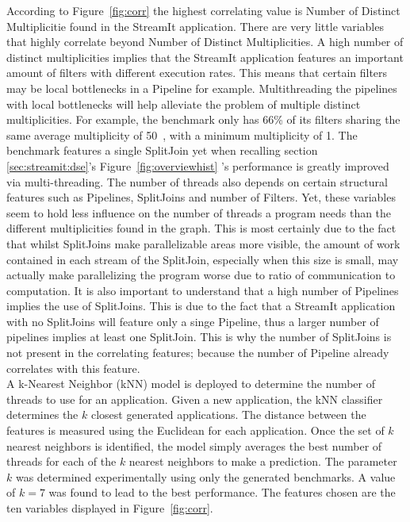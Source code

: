 According to Figure~\ref{fig:corr} the highest correlating value is Number of Distinct Multiplicitie found in the StreamIt application.
There are very little variables that highly correlate beyond Number of Distinct Multiplicities.
A high number of distinct multiplicities implies that the StreamIt application features an important amount of filters with different execution rates.
This means that certain filters may be local bottlenecks in a Pipeline for example.
Multithreading the pipelines with local bottlenecks will help alleviate the problem of multiple distinct multiplicities.
For example, the benchmark  only has 66\% of its filters sharing the same average multiplicity of 50~\cite{theis2010empericalcharstreamit}, with a minimum multiplicity of 1. 
The benchmark features a single SplitJoin yet when recalling section \ref{sec:streamit:dse}'s Figure~\ref{fig:overviewhist} 's performance is greatly improved via multi-threading.
The number of threads also depends on certain structural features such as Pipelines, SplitJoins and number of Filters.
Yet, these variables seem to hold less influence on the number of threads a program needs than the different multiplicities found in the graph.
This is most certainly due to the fact that whilst SplitJoins make parallelizable areas more visible, the amount of work contained in each stream of the SplitJoin, especially when this size is small, may actually make parallelizing the program worse due to ratio of communication to computation.
It is also important to understand that a high number of Pipelines implies the use of SplitJoins.
This is due to the fact that a StreamIt application with no SplitJoins will feature only a singe Pipeline, thus a larger number of pipelines implies at least one SplitJoin.
This is why the number of SplitJoins is not present in the correlating features; because the number of Pipeline already correlates with this feature.\\

A k-Nearest Neighbor (kNN) model is deployed to determine the number of threads to use for an application.
Given a new application, the kNN classifier determines the $k$ closest generated applications.
The distance between the features is measured using the Euclidean for each application.
Once the set of $k$ nearest neighbors is identified, the model simply averages the best number of threads for each of the $k$ nearest neighbors to make a prediction.
The parameter $k$ was determined experimentally using only the generated benchmarks.
A value of $k=7$ was found to lead to the best performance.
The features chosen are the ten variables displayed in Figure~\ref{fig:corr}.

